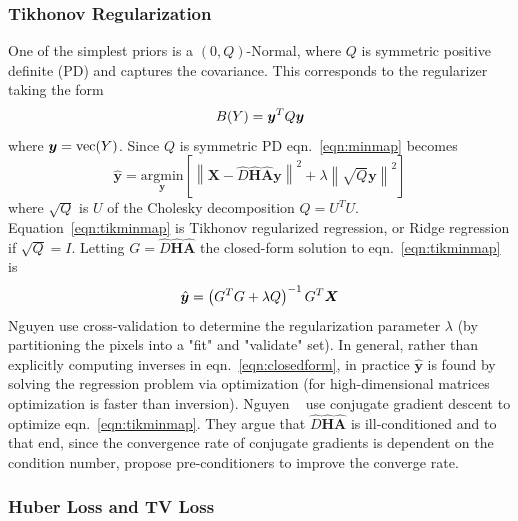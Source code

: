 \subsubsection{Tikhonov Regularization}

One of the simplest priors is a $(0, Q)$-Normal, where $Q$ is symmetric positive definite (PD) and captures the covariance.
%
This corresponds to the regularizer taking the form
\begin{equation}
    B(Y) = \bm{y} ^T Q \bm{y}
\end{equation}
where $\bm{y} = \text{vec}(Y)$.
%
Since $Q$ is symmetric PD eqn.~\eqref{eqn:minmap} becomes
\begin{equation}
    \hat{\bm{y}} = \underset{\bm{y}}{\text{argmin}}\left[ \left\| \bm{X} - \hat{D} \hat{\bm{H}} \hat{\bm{A}} \bm{y} \right\|^2 +\lambda \left\| \sqrt{Q}\bm{y} \right\|^2 \right]
    \label{eqn:tikminmap}
\end{equation}
where $\sqrt{Q}$ is $U$ of the Cholesky decomposition $Q = U^T U$.
%
Equation~\ref{eqn:tikminmap} is Tikhonov regularized regression, or Ridge regression if $\sqrt{Q} = I$.
%
Letting $G = \hat{D} \hat{\bm{H}} \hat{\bm{A}}$ the closed-form solution to eqn.~\eqref{eqn:tikminmap} is
\begin{equation}
    \hat{\by} = \left( G^T G + \lambda Q \right)^{-1} G^T\bX
    \label{eqn:closedform}
\end{equation}
Nguyen \etal\cite{milanfar2001} use cross-validation to determine the regularization parameter $\lambda$ (by partitioning the pixels into a "fit" and "validate" set).
%
In general, rather than explicitly computing inverses in eqn.~\eqref{eqn:closedform}, in practice $\hat{\bm{y}}$ is found by solving the regression problem via optimization (for high-dimensional matrices optimization is faster than inversion).
%
Nguyen \etal~ use conjugate gradient descent to optimize eqn.~\eqref{eqn:tikminmap}.
%
They argue that $\hat{D} \hat{\bm{H}} \hat{\bm{A}}$ is ill-conditioned and to that end, since the convergence rate of conjugate gradients is dependent on the condition number\cite{vanderSluis1986}, propose pre-conditioners to improve the converge rate.

\subsubsection{Huber Loss and TV Loss}

